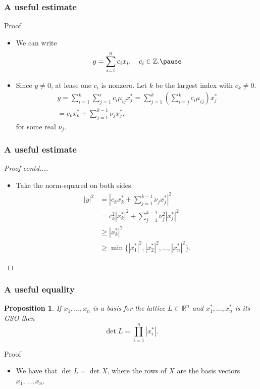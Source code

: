 \documentclass{beamer}
\newcommand{\integers}{\mathbb{Z}}
\newcommand{\reals}{\mathbb{R}}
\newtheorem{proposition}[theorem]{Proposition}
\begin{document}
\begin{frame}
	\frametitle{A useful estimate}
	\begin{block}{Proof}
		\begin{itemize}
			\item We can write
			\[
			y = \sum_{i=1}^nc_ix_i,\quad c_i\in \integers.\pause
			\]
			\item Since $y\neq 0$, at lease one $c_i$ is nonzero. Let $k$ be the largest index with $c_k \neq 0$.\pause
			\begin{multline*}
			y = \sum_{i=1}^k\sum_{j=1}^ic_i\mu_{ij}x_j^* = \sum_{j=1}^k\left(\sum_{i=j}^kc_i\mu_{ij}\right)x_j^*\\
			= c_kx_k^* + \sum_{j=1}^{k-1}\nu_jx_j^*,
			\end{multline*}
			for some real $\nu_j$.
		\end{itemize}
	\end{block}
\end{frame}

\begin{frame}
	\frametitle{A useful estimate}
	\begin{proof}[Proof contd...]
		\begin{itemize}
			\item Take the norm-squared on both sides.
			\begin{align*}
				|y|^2 &= \left|c_kx_k^* + \sum_{j=1}^{k-1}\nu_jx_j^*\right|^2\\
				&= c_k^2|x_k^*|^2 + \sum_{j=1}^{k-1}\nu_j^2|x_j^*|^2\\
				&\geq |x_k^*|^2\\
				&\geq \min\{|x_1^*|^2, |x_2^*|^2, \ldots, |x_n^*|^2\}.
			\end{align*}
		\end{itemize}
	\end{proof}
\end{frame}

\begin{frame}
	\frametitle{A useful equality}
	\begin{proposition}
		If $x_1, \ldots, x_n$ is a basis for the lattice $L\subset \reals^n$ and $x_1^*, \ldots, x_n^*$ is its GSO then
		\[
		\det L = \prod_{i=1}^n |x_i^*|.
		\]	
	\end{proposition}
	\begin{block}{Proof}
	\begin{itemize}
		\item We have that $\det L = \det X$, where the rows of $X$ are the basis vectors $x_1, \ldots, x_n$.
	\end{itemize}
	\end{block}
\end{frame}
\end{document}
